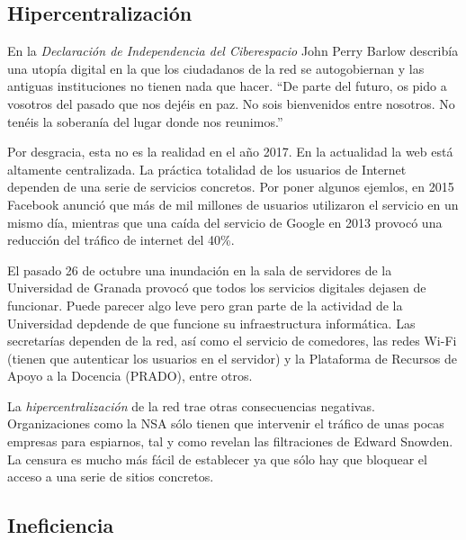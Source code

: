 \documentclass[12pt]{article} %
\begin{document}

\subsection{Hipercentralización} %
\label{sub:hipercentralización}

En la \textit{Declaración de Independencia del Ciberespacio}\cite{cyberspace-independence} John Perry Barlow describía una utopía digital en la que los ciudadanos de la red se autogobiernan y las antiguas instituciones no tienen nada que hacer. ``De parte del futuro, os pido a vosotros del pasado que nos dejéis en paz. No sois bienvenidos entre nosotros. No tenéis la soberanía del lugar donde nos reunimos.'' 

Por desgracia, esta no es la realidad en el año 2017. En la actualidad la web está altamente centralizada. La práctica totalidad de los usuarios de Internet dependen de una serie de servicios concretos. Por poner algunos ejemlos, en 2015 Facebook anunció que más de mil millones de usuarios utilizaron el servicio en un mismo día\cite{billion-facebook}, mientras que una caída del servicio de Google en 2013 provocó una reducción del tráfico de internet del 40\%\cite{google-outage}.

El pasado 26 de octubre una inundación en la sala de servidores de la Universidad de Granada provocó que todos los servicios digitales dejasen de funcionar. Puede parecer algo leve pero gran parte de la actividad de la Universidad depdende de que funcione su infraestructura informática. Las secretarías dependen de la red, así como el servicio de comedores, las redes Wi-Fi (tienen que autenticar los usuarios en el servidor) y la Plataforma de Recursos de Apoyo a la Docencia (PRADO), entre otros.

La \textit{hipercentralización} de la red trae otras consecuencias negativas. Organizaciones como la NSA sólo tienen que intervenir el tráfico de unas pocas empresas para espiarnos, tal y como revelan las filtraciones de Edward Snowden\cite{snowden-leaks}. La censura es mucho más fácil de establecer ya que sólo hay que bloquear el acceso a una serie de sitios concretos. 


\subsection{Ineficiencia} %
\label{sub:ineficiencia}
\end{document}
